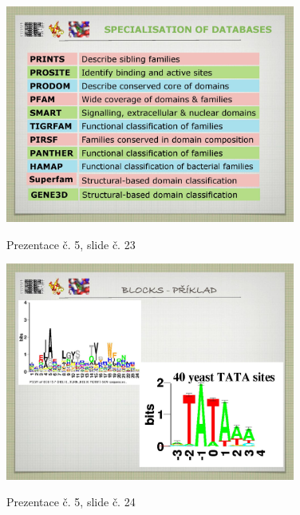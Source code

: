 \documentclass[DIV=8]{scrreprt}
\begin{document}
\begin{figure}
    \caption{Prezentace č. 5, slide č. 23}
    \includegraphics[width=0.85\textwidth]{slides-5/slide-23.jpg}
    \centering
    \label{slides-5-slide-23}
\end{figure}
\begin{figure}
    \caption{Prezentace č. 5, slide č. 24}
    \includegraphics[width=0.85\textwidth]{slides-5/slide-24.jpg}
    \centering
    \label{slides-5-slide-24}
\end{figure}
\end{document}
